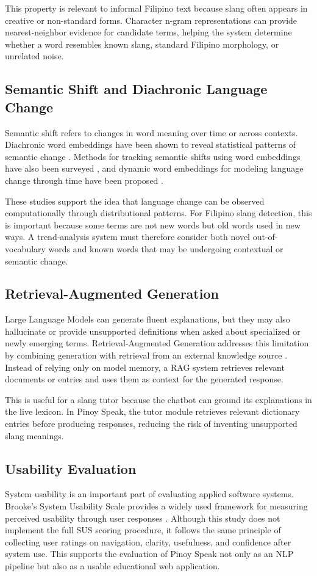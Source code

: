 This property is relevant to informal Filipino text because
slang often appears in creative or non-standard forms.
Character n-gram representations can provide nearest-neighbor
evidence for candidate terms, helping the system determine
whether a word resembles known slang, standard Filipino
morphology, or unrelated noise.

\subsection{Semantic Shift and Diachronic Language Change}

Semantic shift refers to changes in word meaning over time or
across contexts. Diachronic word embeddings have been shown to
reveal statistical patterns of semantic change \cite{b7}.
Methods for tracking semantic shifts using word embeddings have
also been surveyed \cite{b8}, and dynamic word embeddings for
modeling language change through time have been proposed
\cite{b9}.

These studies support the idea that language change can be
observed computationally through distributional patterns. For
Filipino slang detection, this is important because some terms
are not new words but old words used in new ways. A
trend-analysis system must therefore consider both novel
out-of-vocabulary words and known words that may be undergoing
contextual or semantic change.

\subsection{Retrieval-Augmented Generation}

Large Language Models can generate fluent explanations, but
they may also hallucinate or provide unsupported definitions
when asked about specialized or newly emerging terms.
Retrieval-Augmented Generation addresses this limitation by
combining generation with retrieval from an external knowledge
source \cite{b10}. Instead of relying only on model memory, a
RAG system retrieves relevant documents or entries and uses
them as context for the generated response.

This is useful for a slang tutor because the chatbot can
ground its explanations in the live lexicon. In Pinoy Speak,
the tutor module retrieves relevant dictionary entries before
producing responses, reducing the risk of inventing
unsupported slang meanings.

\subsection{Usability Evaluation}

System usability is an important part of evaluating applied
software systems. Brooke's System Usability Scale provides a
widely used framework for measuring perceived usability through
user responses \cite{b11}. Although this study does not
implement the full SUS scoring procedure, it follows the same
principle of collecting user ratings on navigation, clarity,
usefulness, and confidence after system use. This supports the
evaluation of Pinoy Speak not only as an NLP pipeline but also
as a usable educational web application.
